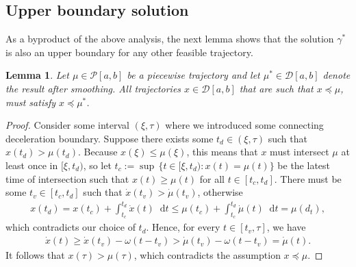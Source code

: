 \documentclass[a4paper]{report}
\theoremstyle{definition}
\theoremstyle{plain}
\newtheorem{lemma}{Lemma}[chapter]
\newcommand\halfopen[2]{\ensuremath{[#1,#2)}}
\newcommand*\diff{\mathop{}\!\mathrm{d}}
\begin{document}
\subsection{Upper boundary solution}\label{sec:upper-bound-property}

As a byproduct of the above analysis, the next lemma shows that the solution
$\gamma^{*}$ is also an upper boundary for any other feasible trajectory.

\begin{lemma}\label{lemma:upperbound}
  Let $\mu \in \mathcal{P}[a,b]$ be a piecewise trajectory and let
  $\mu^{*} \in \mathcal{D}[a,b]$ denote the result after smoothing. All
  trajectories $x \in \mathcal{D}[a, b]$ that are such that
  $x \preceq \mu$, must satisfy $x \preceq \mu^{*}$.
\end{lemma}
\begin{proof}
  Consider some interval $(\xi, \tau)$ where we introduced some connecting
  deceleration boundary. Suppose there exists some $t_{d} \in (\xi, \tau)$ such that
  $x(t_{d}) > \mu(t_{d})$. Because $x(\xi) \leq \mu(\xi)$, this means that $x$ must
  intersect $\mu$ at least once in $\halfopen{\xi}{t_{d}}$, so let
  $t_{c} := \sup \, \{ t \in \halfopen{\xi}{t_{d}} : x(t) = \mu(t) \}$ be the latest
  time of intersection such that $x(t) \geq \mu(t)$ for all $t \in [t_{c}, t_{d}]$.
  There must be some $t_{v} \in [t_{c}, t_{d}]$ such that $\dot{x}(t_{v}) > \dot{\mu}(t_{v})$,
  otherwise
  \begin{align*}
    x(t_{d}) = x(t_{c}) + \int_{t_{c}}^{t_{d}} \dot{x}(t) \diff t \leq \mu(t_{c}) + \int_{t_{c}}^{t_{d}} \dot{\mu}(t) \diff t = \mu(d_{t}) ,
  \end{align*}
  which contradicts our choice of $t_{d}$. Hence, for every
  $t \in [t_{v}, \tau]$, we have
  \begin{align*}
    \dot{x}(t) \geq \dot{x}(t_{v}) - \omega (t - t_{v}) > \dot{\mu}(t_{v}) - \omega(t - t_{v}) = \dot{\mu}(t) .
  \end{align*}
  It follows that $x(\tau) > \mu(\tau)$, which contradicts the assumption
  $x \preceq \mu$.
\end{proof}
\end{document}
